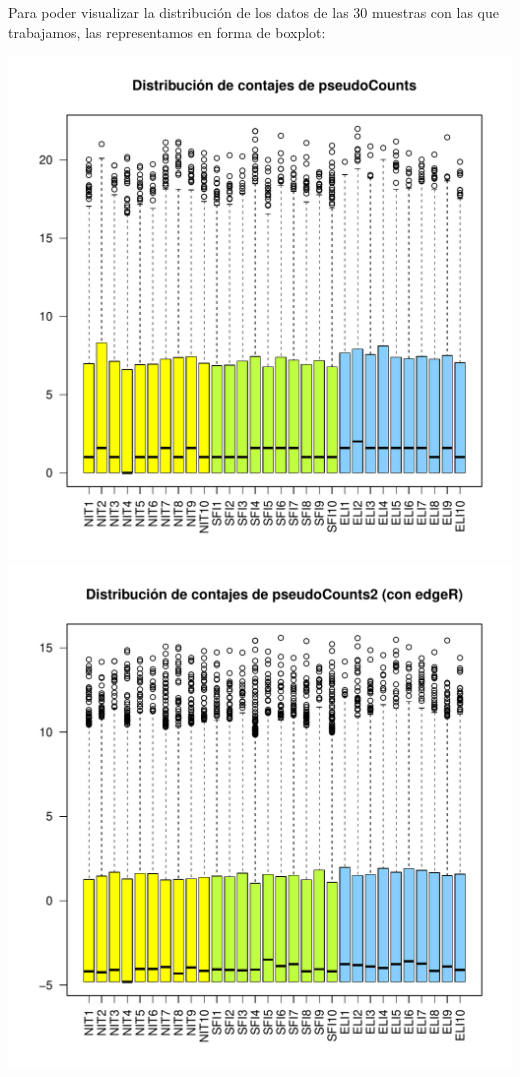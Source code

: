 \documentclass[
  english,
]{article}
\begin{document}
Para poder visualizar la distribución de los datos de las 30 muestras
con las que trabajamos, las representamos en forma de boxplot:

\includegraphics{ortega_rita_ADO_PEC2_files/figure-latex/boxplot_rawdata_pseudocounts-1.pdf}
\includegraphics{ortega_rita_ADO_PEC2_files/figure-latex/boxplot_rawdata_pseudocounts2-1.pdf}
\end{document}
